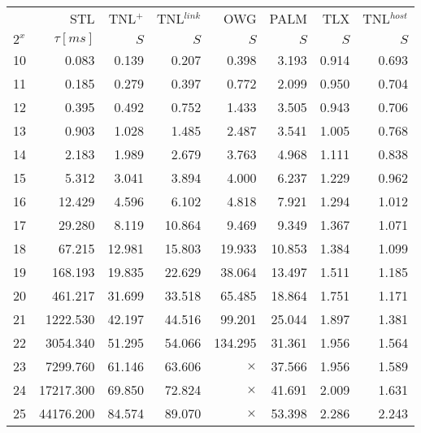 \begin{tabular}{lr|rrrrrr}
  \toprule
  {}    & STL        & TNL$^+$ & TNL$^{link}$ & OWG      & PALM   & TLX   & TNL$^{host}$ \\
  $2^x$ & $\tau[ms]$ & $S$     & $S$          & $S$      & $S$    & $S$   & $S$          \\
  \midrule
  10    & 0.083      & 0.139   & 0.207        & 0.398    & 3.193  & 0.914 & 0.693        \\
  11    & 0.185      & 0.279   & 0.397        & 0.772    & 2.099  & 0.950 & 0.704        \\
  12    & 0.395      & 0.492   & 0.752        & 1.433    & 3.505  & 0.943 & 0.706        \\
  13    & 0.903      & 1.028   & 1.485        & 2.487    & 3.541  & 1.005 & 0.768        \\
  14    & 2.183      & 1.989   & 2.679        & 3.763    & 4.968  & 1.111 & 0.838        \\
  15    & 5.312      & 3.041   & 3.894        & 4.000    & 6.237  & 1.229 & 0.962        \\
  16    & 12.429     & 4.596   & 6.102        & 4.818    & 7.921  & 1.294 & 1.012        \\
  17    & 29.280     & 8.119   & 10.864       & 9.469    & 9.349  & 1.367 & 1.071        \\
  18    & 67.215     & 12.981  & 15.803       & 19.933   & 10.853 & 1.384 & 1.099        \\
  19    & 168.193    & 19.835  & 22.629       & 38.064   & 13.497 & 1.511 & 1.185        \\
  20    & 461.217    & 31.699  & 33.518       & 65.485   & 18.864 & 1.751 & 1.171        \\
  21    & 1222.530   & 42.197  & 44.516       & 99.201   & 25.044 & 1.897 & 1.381        \\
  22    & 3054.340   & 51.295  & 54.066       & 134.295  & 31.361 & 1.956 & 1.564        \\
  23    & 7299.760   & 61.146  & 63.606       & $\times$ & 37.566 & 1.956 & 1.589        \\
  24    & 17217.300  & 69.850  & 72.824       & $\times$ & 41.691 & 2.009 & 1.631        \\
  25    & 44176.200  & 84.574  & 89.070       & $\times$ & 53.398 & 2.286 & 2.243        \\
  \bottomrule
\end{tabular}


